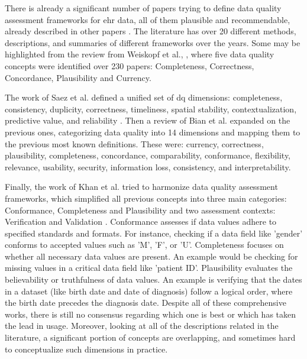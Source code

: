 
There is already a significant number of papers trying to define data quality assessment frameworks for \ac{ehr} data, all of them plausible and recommendable, already described in other papers \cite{bianAssessingPracticeData2020}. The literature has over 20 different methods, descriptions, and summaries of  different frameworks over the years. Some may be highlighted from the review from Weiskopf et al., \cite{weiskopfMethodsDimensionsElectronic2013}, where five data quality concepts were identified over 230 papers: Completeness, Correctness, Concordance, Plausibility and Currency. 



The work of Saez et al. defined a unified set of \ac{dq} dimensions: completeness, consistency, duplicity, correctness, timeliness, spatial stability, contextualization, predictive value, and reliability \cite{saezOrganizingDataQuality2012}. Then a review of Bian et al. \cite{bianAssessingPracticeData2020} expanded on the previous ones, categorizing data quality into 14 dimensions and mapping them to the previous most known definitions. These were: currency, correctness, plausibility, completeness, concordance, comparability, conformance, flexibility, relevance, usability, security, information loss, consistency, and interpretability.

Finally, the work of Khan et al. tried to harmonize data quality assessment frameworks, which simplified all previous concepts into three main categories: Conformance, Completeness and Plausibility and two assessment contexts: Verification and Validation \cite{kahnHarmonizedDataQuality2016a}.
Conformance  assesses if data values adhere to specified standards and formats. For instance, checking if a data field like 'gender' conforms to accepted values such as 'M', 'F', or 'U'. Completeness focuses on whether all necessary data values are present. An example would be checking for missing values in a critical data field like 'patient ID'. Plausibility evaluates the believability or truthfulness of data values. An example is verifying that the dates in a dataset (like birth date and date of diagnosis) follow a logical order, where the birth date precedes the diagnosis date. Despite all of these comprehensive works, there is still no consensus regarding which one is best or which has taken the lead in usage. Moreover, looking at all of the descriptions related in the literature, a significant portion of concepts are overlapping, and sometimes hard to conceptualize such dimensions in practice.

